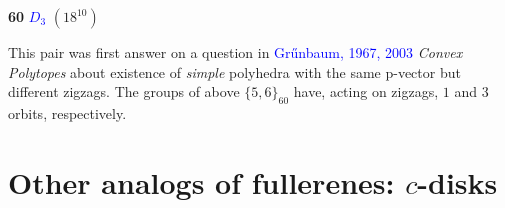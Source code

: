 \documentclass{beamer}
\begin{document}
\begin{frame}
\begin{center}
\begin{minipage}{4.4cm}
\par
{\bf 60} \textcolor{blue}{$D_3$}  $(18^{10})$
\end{minipage}
\end{center}
This pair was first answer on a question in  \textcolor{blue}{Gr\H{u}nbaum, 
1967, 2003}
{\em Convex Polytopes} about existence of {\em simple}
polyhedra with the same p-vector but different zigzags.
The groups of above $\{5,6\}_{60}$ have, acting on zigzags,  $1$ and $3$ orbits,
respectively.
\end{frame}

\section[]{Other analogs of fullerenes: $c$-disks}

\end{document}
